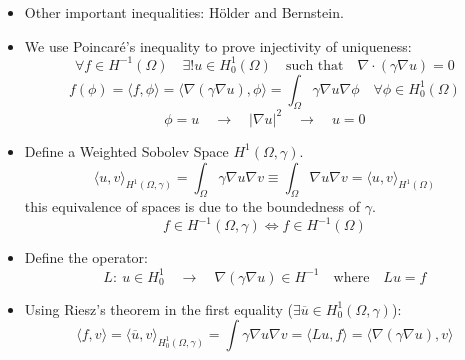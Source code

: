 \documentclass{article}
\begin{document}
\begin{itemize}
    \item Other important inequalities: Hölder and Bernstein.

    \item We use Poincaré's inequality to prove injectivity of uniqueness:
    \begin{equation}
        \forall f \in H^{-1}(\Omega) \quad \exists! u \in H_0^1(\Omega) \quad \text{such that} \quad \nabla \cdot (\gamma \nabla u) = 0
    \end{equation}
    \begin{equation}
        f(\phi) = \langle f, \phi \rangle =  \langle \nabla(\gamma \nabla u), \phi \rangle = \int_\Omega \gamma \nabla u \nabla \phi \quad \forall \phi \in H_0^1(\Omega)
    \end{equation}
    \begin{equation}
        \phi = u \quad \rightarrow \quad |\nabla u|^2 \quad \rightarrow \quad u=0
    \end{equation}

    \item Define a Weighted Sobolev Space $H^1(\Omega, \gamma)$.
    \begin{equation}
        \langle u, v \rangle_{H^1(\Omega, \gamma)} = \int_\Omega \gamma \nabla u \nabla v \equiv  \int_\Omega \nabla u \nabla v = \langle u, v \rangle_{H^1(\Omega)}
    \end{equation}
    this equivalence of spaces is due to the boundedness of $\gamma$.
    \begin{equation}
        f \in H^{-1}(\Omega, \gamma) \iff f \in H^{-1}(\Omega)
    \end{equation}

    \item Define the operator:
    \begin{equation}
        L: \ u \in H_0^1 \quad \rightarrow \quad \nabla(\gamma \nabla u) \in H^{-1} \quad \text{where} \quad Lu = f
    \end{equation}

    \item Using Riesz's theorem in the first equality ($\exists \overline{u} \in H_0^1(\Omega, \gamma)$):
    \begin{equation}
        \langle f, v \rangle = \langle \overline{u}, v \rangle_{H_0^1(\Omega, \gamma)} = \int \gamma \nabla u \nabla v = \langle Lu, f \rangle = \langle \nabla(\gamma \nabla u), v \rangle
    \end{equation}
\end{itemize}
\end{document}
